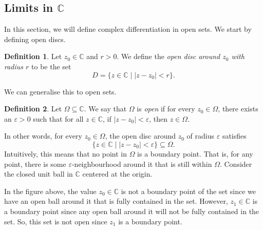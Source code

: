 \documentclass[a4paper, openany]{memoir}
\theoremstyle{definition}
\newtheorem{definition}{Definition}[section]
\theoremstyle{plain}
\begin{document}
\subsection{Limits in $\mathbb{C}$}
In this section, we will define complex differentiation in open sets. We start by defining open discs.
\begin{definition}
Let $z_0 \in \mathbb{C}$ and $r > 0$. We define the \emph{open disc around $z_0$ with radius $r$} to be the set
\[D = \{z \in \mathbb{C} \mid |z - z_0| < r\}.\]
\end{definition}
\noindent We can generalise this to open sets.
\begin{definition}
Let $\Omega \subseteq \mathbb{C}$. We say that $\Omega$ is \emph{open} if for every $z_0 \in \Omega$, there exists an $\varepsilon > 0$ such that for all $z \in \mathbb{C}$, if $|z - z_0| < \varepsilon$, then $z \in \Omega$.
\end{definition}
\noindent In other words, for every $z_0 \in \Omega$, the open disc around $z_0$ of radius $\varepsilon$ satisfies
\[\{z \in \mathbb{C} \mid |z - z_0| < \varepsilon\} \subseteq \Omega.\]
Intuitively, this means that no point in $\Omega$ is a boundary point. That is, for any point, there is some $\varepsilon$-neighbourhood around it that is still within $\Omega$. Consider the closed unit ball in $\mathbb{C}$ centered at the origin.
\begin{figure}[H]
    \centering
\end{figure}
\noindent In the figure above, the value $z_0 \in \mathbb{C}$ is not a boundary point of the set since we have an open ball around it that is fully contained in the set. However, $z_1 \in \mathbb{C}$ is a boundary point since any open ball around it will not be fully contained in the set. So, this set is not open since $z_1$ is a boundary point.
\end{document}
